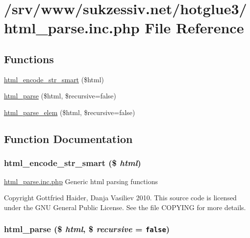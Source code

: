 \hypertarget{html__parse_8inc_8php}{
\section{/srv/www/sukzessiv.net/hotglue3/html\_\-parse.inc.php File Reference}
\label{html__parse_8inc_8php}
}
\subsection*{Functions}
\begin{CompactItemize}
\item 
\hyperlink{html__parse_8inc_8php_7eda4037f4b2576b3bcd97408ff95bd5}{html\_\-encode\_\-str\_\-smart} (\$html)
\item 
\hyperlink{html__parse_8inc_8php_1003b146f08aef5a3a78d75a3538a4d7}{html\_\-parse} (\$html, \$recursive=false)
\item 
\hyperlink{html__parse_8inc_8php_6d9c21ee610953fb5b5b64fae3f74ed3}{html\_\-parse\_\-elem} (\$html, \$recursive=false)
\end{CompactItemize}


\subsection{Function Documentation}
\hypertarget{html__parse_8inc_8php_7eda4037f4b2576b3bcd97408ff95bd5}{
\subsubsection[{html\_\-encode\_\-str\_\-smart}]{\setlength{\rightskip}{0pt plus 5cm}html\_\-encode\_\-str\_\-smart (\$ {\em html})}}
\label{html__parse_8inc_8php_7eda4037f4b2576b3bcd97408ff95bd5}


\hyperlink{html__parse_8inc_8php}{html\_\-parse.inc.php} Generic html parsing functions

Copyright Gottfried Haider, Danja Vasiliev 2010. This source code is licensed under the GNU General Public License. See the file COPYING for more details. \hypertarget{html__parse_8inc_8php_1003b146f08aef5a3a78d75a3538a4d7}{
\subsubsection[{html\_\-parse}]{\setlength{\rightskip}{0pt plus 5cm}html\_\-parse (\$ {\em html}, \/  \$ {\em recursive} = {\tt false})}}
\label{html__parse_8inc_8php_1003b146f08aef5a3a78d75a3538a4d7}


